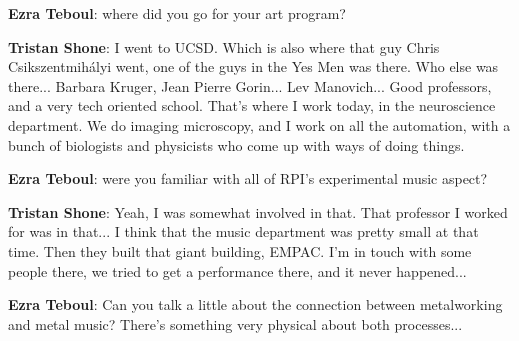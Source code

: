 \textbf{Ezra Teboul}: where did you go for your art program? 

\textbf{Tristan Shone}: I went to UCSD. Which is also where that guy Chris Csikszentmihályi went, one of the guys in the Yes Men was there. Who else was there... Barbara Kruger, Jean Pierre Gorin... Lev Manovich... Good professors, and a very tech oriented school. That's where I work today, in the neuroscience department. We do imaging microscopy, and I work on all the automation, with a bunch of biologists and physicists who come up with ways of doing things. 

\textbf{Ezra Teboul}: were you familiar with all of RPI's experimental music aspect? 

\textbf{Tristan Shone}: Yeah, I was somewhat involved in that. That professor I worked for was in that... I think that the music department was pretty small at that time. Then they built that giant building, EMPAC. I'm in touch with some people there, we tried to get a performance there, and it never happened... 

\textbf{Ezra Teboul}: Can you talk a little about the connection between metalworking and metal music? There's something very physical about both processes...


